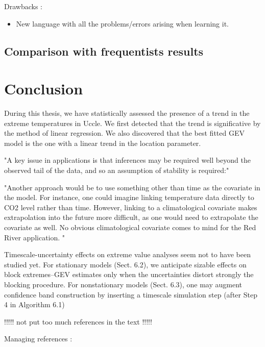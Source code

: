 \documentclass[11pt,a4paper,openany ]{book}
\begin{document}
Drawbacks : 

\begin{itemize}
	\item New language with all the problems/errors arising when learning it. 
\end{itemize}



\section{Comparison with frequentists results}



\chapter{Conclusion}
\thispagestyle{empty}

During this thesis, we have statistically assessed the presence of a trend in the extreme temperatures in Uccle. We first detected that the trend is significative by the method of linear regression. We also discovered that the best fitted GEV model is the one with a linear trend in the location parameter.

"A key issue in applications is that inferences
may be required well beyond the observed tail of
the data, and so an assumption of stability is required:" \cite{davison_statistical_2012}

"Another approach would be to use something other than time as the covariate 
in the model. For instance, one could imagine linking temperature data directly to
CO2 level rather than time. However, linking to a climatological covariate makes
extrapolation into the future more difficult, as one would need to extrapolate the 
covariate as well. No obvious climatological covariate comes to mind for the Red
River application. " %


Timescale-uncertainty effects on extreme value analyses seem not to have been
studied yet. For stationary models (Sect. 6.2), we anticipate sizable effects on block
extremes–GEV estimates only when the uncertainties distort strongly the blocking
procedure. For nonstationary models (Sect. 6.3), one may augment confidence band
construction by inserting a timescale simulation step (after Step 4 in Algorithm 6.1) \citet[pp.262]{mudelsee_climate_2014}

!!!!! not put too much references in the text !!!!!

Managing references : 
\end{document}
